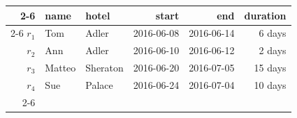 \begin{tabular}[t]{r|llrrr|}
  \cline{2-6}
 & \bf name & \bf hotel & \bf start & \bf end & \bf duration\\
  \cline{2-6}
$r_1$ & Tom & Adler & 2016-06-08 & 2016-06-14 & 6 days\\
$r_2$ & Ann & Adler & 2016-06-10 & 2016-06-12 & 2 days\\
$r_3$ & Matteo & Sheraton & 2016-06-20 & 2016-07-05 & 15 days\\
$r_4$ & Sue & Palace & 2016-06-24 & 2016-07-04 & 10 days\\
  \cline{2-6}
\end{tabular}

